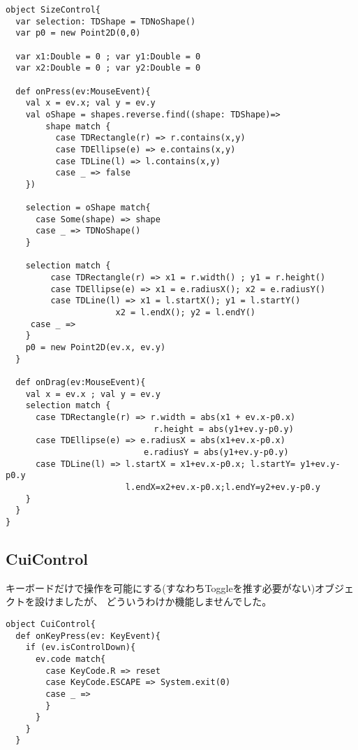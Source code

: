 \documentclass [11pt] {jsarticle}
\begin{document}
\begin{verbatim}
object SizeControl{
  var selection: TDShape = TDNoShape()
  var p0 = new Point2D(0,0)

  var x1:Double = 0 ; var y1:Double = 0
  var x2:Double = 0 ; var y2:Double = 0

  def onPress(ev:MouseEvent){
    val x = ev.x; val y = ev.y
    val oShape = shapes.reverse.find((shape: TDShape)=>
        shape match {
          case TDRectangle(r) => r.contains(x,y)
          case TDEllipse(e) => e.contains(x,y)
          case TDLine(l) => l.contains(x,y)
          case _ => false
    })

    selection = oShape match{
      case Some(shape) => shape
      case _ => TDNoShape()
    }

    selection match {
 		 case TDRectangle(r) => x1 = r.width() ; y1 = r.height()
 		 case TDEllipse(e) => x1 = e.radiusX(); x2 = e.radiusY()
 		 case TDLine(l) => x1 = l.startX(); y1 = l.startY()
                      x2 = l.endX(); y2 = l.endY()
     case _ =>
    }
    p0 = new Point2D(ev.x, ev.y)
  }

  def onDrag(ev:MouseEvent){
    val x = ev.x ; val y = ev.y
    selection match {
      case TDRectangle(r) => r.width = abs(x1 + ev.x-p0.x)
                            　r.height = abs(y1+ev.y-p0.y)
      case TDEllipse(e) => e.radiusX = abs(x1+ev.x-p0.x)
                          　e.radiusY = abs(y1+ev.y-p0.y)
      case TDLine(l) => l.startX = x1+ev.x-p0.x; l.startY= y1+ev.y-p0.y
                        l.endX=x2+ev.x-p0.x;l.endY=y2+ev.y-p0.y
    }
  }
}
\end{verbatim}

\subsection{CuiControl}
キーボードだけで操作を可能にする(すなわちToggleを推す必要がない)オブジェクトを設けましたが、
どういうわけか機能しませんでした。

\begin{verbatim}
object CuiControl{
  def onKeyPress(ev: KeyEvent){
    if (ev.isControlDown){
      ev.code match{
        case KeyCode.R => reset
        case KeyCode.ESCAPE => System.exit(0)
        case _ =>
        }
      }
    }
  }
\end{verbatim}
\end{document}
